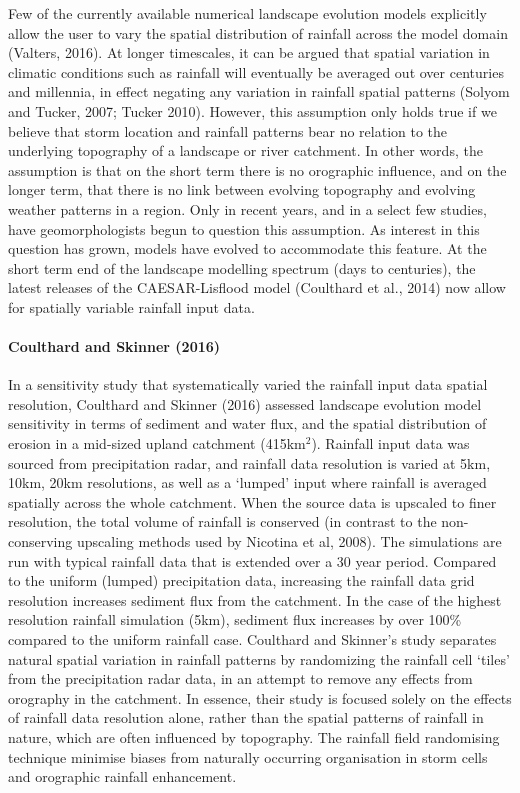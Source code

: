 Few of the currently available numerical landscape evolution models explicitly allow the user to vary the spatial distribution of rainfall across the model domain (Valters, 2016). At longer timescales, it can be argued that spatial variation in climatic conditions such as rainfall will eventually be averaged out over centuries and millennia, in effect negating any variation in rainfall spatial patterns (Solyom and Tucker, 2007; Tucker 2010). However, this assumption only holds true if we believe that storm location and rainfall patterns bear no relation to the underlying topography of a landscape or river catchment. In other words, the assumption is that on the short term there is no orographic influence, and on the longer term, that there is no link between evolving topography and evolving weather patterns in a region. Only in recent years, and in a select few studies, have geomorphologists begun to question this assumption. As interest in this question has grown, models have evolved to accommodate this feature. At the short term end of the landscape modelling spectrum (days to centuries), the latest releases of the CAESAR-Lisflood model (Coulthard et al., 2014) now allow for spatially variable rainfall input data. 

\paragraph{Coulthard and Skinner (2016)}

In a sensitivity study that systematically varied the rainfall input data spatial resolution, Coulthard and Skinner (2016) assessed landscape evolution model sensitivity in terms of sediment and water flux, and the spatial distribution of erosion in a mid-sized upland catchment (415km\(^2\)). Rainfall input data was sourced from precipitation radar, and rainfall data resolution is varied at 5km, 10km, 20km resolutions, as well as a `lumped' input where rainfall is averaged spatially across the whole catchment. When the source data is upscaled to finer resolution, the total volume of rainfall is conserved (in contrast to the non-conserving upscaling methods used by Nicotina et al, 2008). The simulations are run with typical rainfall data that is extended over a 30 year period. Compared to the uniform (lumped) precipitation data, increasing the rainfall data grid resolution increases sediment flux from the catchment. In the case of the highest resolution rainfall simulation (5km), sediment flux increases by over 100\% compared to the uniform rainfall case. Coulthard and Skinner's study separates natural spatial variation in rainfall patterns by randomizing the rainfall cell `tiles' from the precipitation radar data, in an attempt to remove any effects from orography in the catchment. In essence, their study is focused solely on the effects of rainfall data resolution alone, rather than the spatial patterns of rainfall in nature, which are often influenced by topography. The rainfall field randomising technique minimise biases from naturally occurring organisation in storm cells and orographic rainfall enhancement. 

